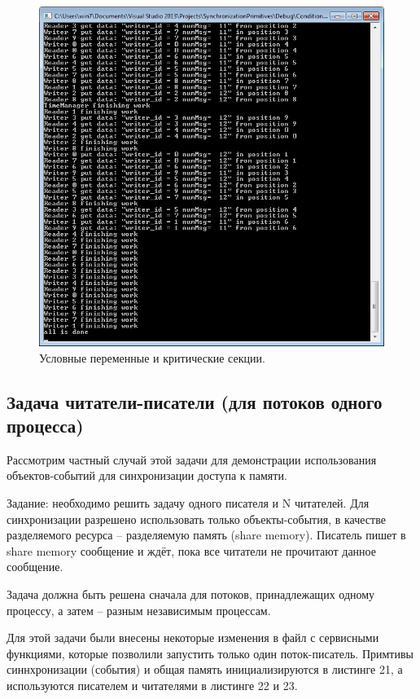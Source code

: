 \documentclass[a4paper, 12pt]{article}		%
\begin{document}
\begin{figure}[h!]
\centering
\includegraphics[scale=1]{res/005}
\caption{Условные переменные и критические секции.}
\end{figure}

\newpage
\subsection{Задача читатели-писатели (для потоков одного процесса)}

Рассмотрим частный случай этой задачи для демонстрации использования объектов-событий для синхронизации доступа к памяти.

Задание: необходимо решить задачу одного писателя и N читателей. Для синхронизации разрешено использовать только объекты-события, в качестве разделяемого ресурса -- разделяемую память (share memory). Писатель пишет в share memory сообщение и ждёт, пока все читатели не прочитают данное сообщение.

Задача должна быть решена сначала для потоков, принадлежащих одному процессу, а затем – разным независимым процессам.

Для этой задачи были внесены некоторые изменения в файл с сервисными функциями, которые позволили запустить только один поток-писатель. Примтивы синнхронизации (события) и общая память инициализируются в листинге 21, а используются писателем и читателями в листинге 22 и 23.
\end{document}

